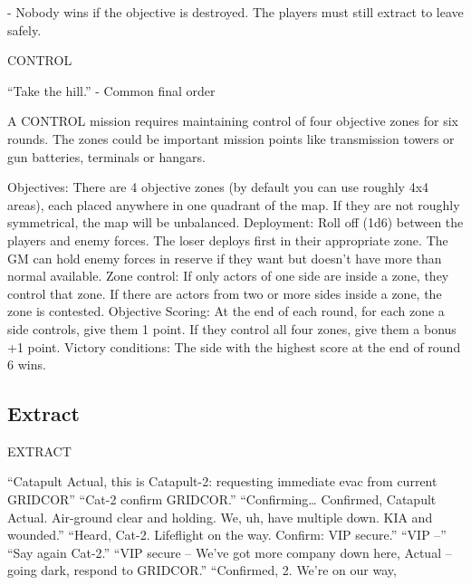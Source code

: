           - Nobody wins if the objective is destroyed. The players must still extract to leave safely.

CONTROL

         “Take the hill.”
                      -    Common final order

A CONTROL mission requires maintaining control of four objective zones for six rounds. The
zones could be important mission points like transmission towers or gun batteries, terminals or
hangars.

Objectives: There are 4 objective zones (by default you can use roughly 4x4 areas), each placed
anywhere in one quadrant of the map. If they are not roughly symmetrical, the map will be
unbalanced.
Deployment: Roll off (1d6) between the players and enemy forces. The loser deploys first in their
appropriate zone. The GM can hold enemy forces in reserve if they want but doesn’t have more
than normal available.
Zone control: If only actors of one side are inside a zone, they control that zone. If there are
actors from two or more sides inside a zone, the zone is contested.
Objective Scoring: At the end of each round, for each zone a side controls, give them 1 point. If
they control all four zones, give them a bonus +1 point.
Victory conditions: The side with the highest score at the end of round 6 wins.




\subsection{Extract}


                                                                     EXTRACT

                                                                     “Catapult Actual, this is Catapult-2:
                                                                     requesting immediate evac from current
                                                                     GRIDCOR”
                                                                            “Cat-2 confirm GRIDCOR.”
                                                                     “Confirming… Confirmed, Catapult Actual.
                                                                     Air-ground clear and holding. We, uh, have
                                                                     multiple down. KIA and wounded.”
                                                                            “Heard, Cat-2. Lifeflight on the way.
                                                                     Confirm: VIP secure.”
                                                                     “VIP --”
                                                                            “Say again Cat-2.”
                                                                     “VIP secure -- We’ve got more company
                                                                     down here, Actual -- going dark, respond to
                                                                     GRIDCOR.”
                                                                            “Confirmed, 2. We’re on our way,

